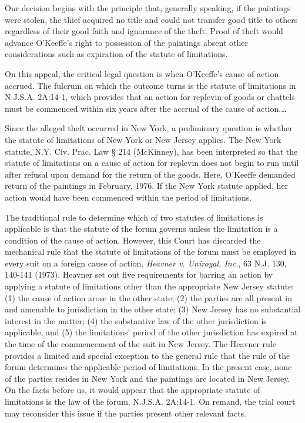 Our decision begins with the principle that, generally speaking, if the
paintings were stolen, the thief acquired no title and could not transfer good
title to others regardless of their good faith and ignorance of the theft.
Proof of theft would advance O'Keeffe's right to possession of the paintings
absent other considerations such as expiration of the statute of limitations.

On this appeal, the critical legal question is when O'Keeffe's cause of action
accrued. The fulcrum on which the outcome turns is the statute of limitations
in N.J.S.A. 2A:14-1, which provides that an action for replevin of goods or
chattels must be commenced within six years after the accrual of the cause of
action.\ldots

Since the alleged theft occurred in New York, a preliminary question is whether
the statute of limitations of New York or New Jersey applies. The New York
statute, N.Y. Civ. Prac. Law {\S} 214 (McKinney), has been interpreted so that
the statute of limitations on a cause of action for replevin does not begin to
run until after refusal upon demand for the return of the goods. Here, O'Keeffe
demanded return of the paintings in February, 1976. If the New York statute
applied, her action would have been commenced within the period of limitations.

The traditional rule to determine which of two statutes of limitations is
applicable is that the statute of the forum governs unless the limitation is a
condition of the cause of action. However, this Court has discarded the
mechanical rule that the statute of limitations of the forum must be employed
in every suit on a foreign cause of action. \textit{Heavner v. Uniroyal, Inc.},
63 N.J. 130, 140-141 (1973). Heavner set out five requirements for barring an
action by applying a statute of limitations other than the appropriate New
Jersey statute: (1) the cause of action arose in the other state; (2) the
parties are all present in and amenable to jurisdiction in the other state; (3)
New Jersey has no substantial interest in the matter; (4) the substantive law
of the other jurisdiction is applicable, and (5) the limitations' period of the
other jurisdiction has expired at the time of the commencement of the suit in
New Jersey. The Heavner rule provides a limited and special exception to the
general rule that the rule of the forum determines the applicable period of
limitations. In the present case, none of the parties resides in New York and
the paintings are located in New Jersey. On the facts before us, it would
appear that the appropriate statute of limitations is the law of the forum,
N.J.S.A. 2A:14-1. On remand, the trial court may reconsider this issue if the
parties present other relevant facts.

